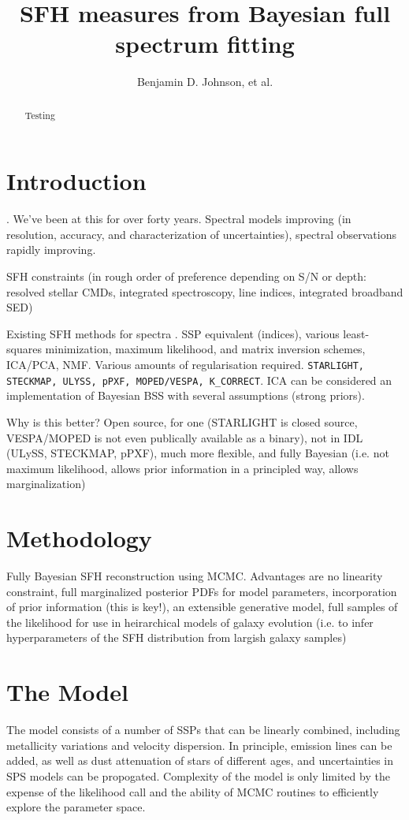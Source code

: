 \documentclass{emulateapj}
\begin{document}
\title{SFH measures from Bayesian full spectrum fitting}
\author{
Benjamin D. Johnson,
et al.}

\begin{abstract}
Testing
\end{abstract}

\section{Introduction}
\citet{tinsley68}.  We've been at this for over forty years. Spectral models improving (in resolution, accuracy, and characterization of uncertainties), spectral observations rapidly improving.

SFH constraints (in rough order of preference depending on S/N or depth: resolved stellar CMDs, integrated spectroscopy, line indices, integrated broadband SED)

Existing SFH methods for spectra \citep{walcher2011}.  SSP equivalent (indices), various least-squares minimization, maximum likelihood, and matrix inversion schemes, ICA/PCA, NMF. Various amounts of regularisation required. \texttt{STARLIGHT, STECKMAP, ULYSS, pPXF, MOPED/VESPA, K\_CORRECT}. ICA can be considered an implementation of Bayesian BSS with several assumptions (strong priors).

Why is this better?   Open source, for one (STARLIGHT is closed source, VESPA/MOPED is not even publically available as a binary), not in IDL (ULySS, STECKMAP, pPXF), much more flexible, and fully Bayesian (i.e. not maximum likelihood, allows prior information in a principled way, allows marginalization)

\section{Methodology}
Fully Bayesian SFH reconstruction using MCMC.  Advantages are no linearity constraint, full marginalized posterior PDFs for model parameters, incorporation of prior information (this is key!), an extensible generative model, full samples of the likelihood for use in heirarchical models of galaxy evolution (i.e. to infer hyperparameters of the SFH distribution from largish galaxy samples)


\section{The Model}
The model consists of a number of SSPs that can be linearly combined, including metallicity variations and velocity dispersion.  In principle, emission lines can be added, as well as dust attenuation of stars of different ages, and uncertainties in SPS models can be propogated.  Complexity of the model is only limited by the expense of the likelihood call and the ability of MCMC routines to efficiently explore the parameter space.
\end{document}
